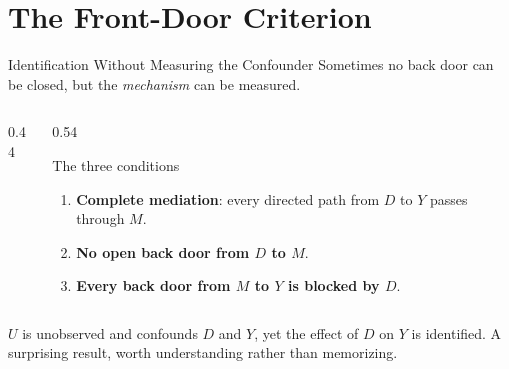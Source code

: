 \documentclass[aspectratio=169,11pt,xcolor=dvipsnames]{beamer}
\begin{document}
\section[Front Door]{The Front-Door Criterion}
\begin{frame}\sectionpage\end{frame}

\begin{frame}{Identification Without Measuring the Confounder}
Sometimes no back door can be closed, but the \emph{mechanism} can be
measured.
\begin{columns}[c]
\begin{column}{0.44\textwidth}
\centering
{}
\end{column}
\begin{column}{0.54\textwidth}
\begin{block}{The three conditions}
\begin{enumerate}\itemsep1pt
  \item \textbf{Complete mediation}: every directed path from $D$ to $Y$
        passes through $M$.
  \item \textbf{No open back door from $D$ to $M$}.
  \item \textbf{Every back door from $M$ to $Y$ is blocked by $D$}.
\end{enumerate}
\end{block}
\end{column}
\end{columns}
\vskip4pt
$U$ is unobserved and confounds $D$ and $Y$, yet the effect of $D$ on $Y$
is identified. A surprising result, worth understanding rather than
memorizing.
\end{frame}
\end{document}
